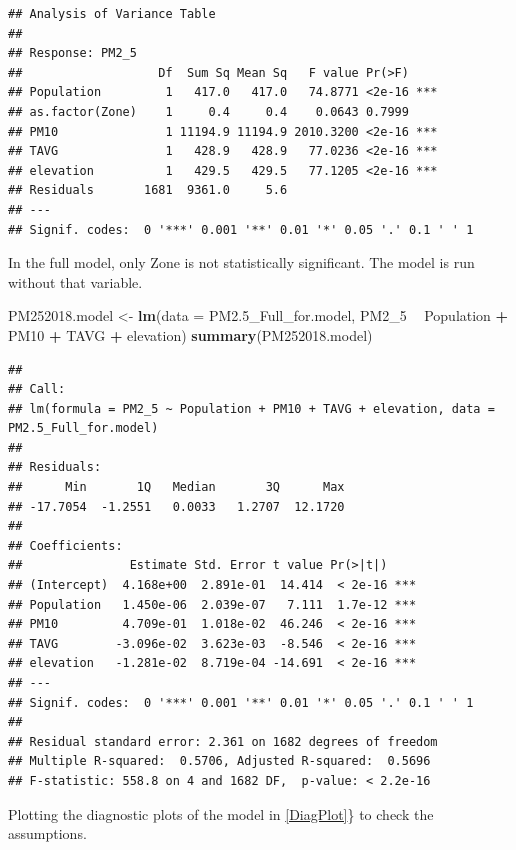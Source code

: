 \documentclass[12pt,]{article}
\newenvironment{Shaded}{\begin{snugshade}}{\end{snugshade}}
\newcommand{\KeywordTok}[1]{\textcolor[rgb]{0.13,0.29,0.53}{\textbf{#1}}}
\newcommand{\DataTypeTok}[1]{\textcolor[rgb]{0.13,0.29,0.53}{#1}}
\newcommand{\DecValTok}[1]{\textcolor[rgb]{0.00,0.00,0.81}{#1}}
\newcommand{\StringTok}[1]{\textcolor[rgb]{0.31,0.60,0.02}{#1}}
\newcommand{\OperatorTok}[1]{\textcolor[rgb]{0.81,0.36,0.00}{\textbf{#1}}}
\newcommand{\NormalTok}[1]{#1}
\begin{document}
\begin{verbatim}
## Analysis of Variance Table
## 
## Response: PM2_5
##                   Df  Sum Sq Mean Sq   F value Pr(>F)    
## Population         1   417.0   417.0   74.8771 <2e-16 ***
## as.factor(Zone)    1     0.4     0.4    0.0643 0.7999    
## PM10               1 11194.9 11194.9 2010.3200 <2e-16 ***
## TAVG               1   428.9   428.9   77.0236 <2e-16 ***
## elevation          1   429.5   429.5   77.1205 <2e-16 ***
## Residuals       1681  9361.0     5.6                     
## ---
## Signif. codes:  0 '***' 0.001 '**' 0.01 '*' 0.05 '.' 0.1 ' ' 1
\end{verbatim}

In the full model, only Zone is not statistically significant. The model
is run without that variable.

\begin{Shaded}
\begin{Highlighting}[]
\NormalTok{PM252018.model <-}\StringTok{ }
\StringTok{  }\KeywordTok{lm}\NormalTok{(}\DataTypeTok{data =}\NormalTok{ PM2.5_Full_for.model, PM2_}\DecValTok{5} \OperatorTok{~}\StringTok{ }
\StringTok{       }\NormalTok{Population }\OperatorTok{+}\StringTok{ }\NormalTok{PM10 }\OperatorTok{+}\StringTok{ }\NormalTok{TAVG }\OperatorTok{+}\StringTok{ }\NormalTok{elevation)}
\KeywordTok{summary}\NormalTok{(PM252018.model)}
\end{Highlighting}
\end{Shaded}

\begin{verbatim}
## 
## Call:
## lm(formula = PM2_5 ~ Population + PM10 + TAVG + elevation, data = PM2.5_Full_for.model)
## 
## Residuals:
##      Min       1Q   Median       3Q      Max 
## -17.7054  -1.2551   0.0033   1.2707  12.1720 
## 
## Coefficients:
##               Estimate Std. Error t value Pr(>|t|)    
## (Intercept)  4.168e+00  2.891e-01  14.414  < 2e-16 ***
## Population   1.450e-06  2.039e-07   7.111  1.7e-12 ***
## PM10         4.709e-01  1.018e-02  46.246  < 2e-16 ***
## TAVG        -3.096e-02  3.623e-03  -8.546  < 2e-16 ***
## elevation   -1.281e-02  8.719e-04 -14.691  < 2e-16 ***
## ---
## Signif. codes:  0 '***' 0.001 '**' 0.01 '*' 0.05 '.' 0.1 ' ' 1
## 
## Residual standard error: 2.361 on 1682 degrees of freedom
## Multiple R-squared:  0.5706, Adjusted R-squared:  0.5696 
## F-statistic: 558.8 on 4 and 1682 DF,  p-value: < 2.2e-16
\end{verbatim}

Plotting the diagnostic plots of the model in \autoref{DiagPlot}\} to
check the assumptions.
\end{document}
